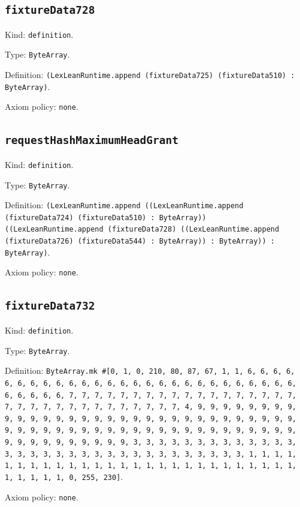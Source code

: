 \documentclass[11pt]{article}
\begin{document}
\subsection*{\texttt{fixtureData728}}
\noindent Kind: \texttt{definition}.\par
\noindent Type: \texttt{ByteArray}.\par
\noindent Definition: \texttt{(LexLeanRuntime.append (fixtureData725) (fixtureData510) : ByteArray)}.\par
\noindent Axiom policy: \texttt{none}.\par
\subsection*{\texttt{requestHashMaximumHeadGrant}}
\noindent Kind: \texttt{definition}.\par
\noindent Type: \texttt{ByteArray}.\par
\noindent Definition: \texttt{(LexLeanRuntime.append ((LexLeanRuntime.append (fixtureData724) (fixtureData510) : ByteArray)) ((LexLeanRuntime.append (fixtureData728) ((LexLeanRuntime.append (fixtureData726) (fixtureData544) : ByteArray)) : ByteArray)) : ByteArray)}.\par
\noindent Axiom policy: \texttt{none}.\par
\subsection*{\texttt{fixtureData732}}
\noindent Kind: \texttt{definition}.\par
\noindent Type: \texttt{ByteArray}.\par
\noindent Definition: \texttt{ByteArray.mk \#[0, 1, 0, 210, 80, 87, 67, 1, 1, 6, 6, 6, 6, 6, 6, 6, 6, 6, 6, 6, 6, 6, 6, 6, 6, 6, 6, 6, 6, 6, 6, 6, 6, 6, 6, 6, 6, 6, 6, 6, 6, 7, 7, 7, 7, 7, 7, 7, 7, 7, 7, 7, 7, 7, 7, 7, 7, 7, 7, 7, 7, 7, 7, 7, 7, 7, 7, 7, 7, 7, 7, 7, 7, 4, 9, 9, 9, 9, 9, 9, 9, 9, 9, 9, 9, 9, 9, 9, 9, 9, 9, 9, 9, 9, 9, 9, 9, 9, 9, 9, 9, 9, 9, 9, 9, 9, 9, 9, 9, 9, 9, 9, 9, 9, 9, 9, 9, 9, 9, 9, 9, 9, 9, 9, 9, 9, 9, 9, 9, 9, 9, 9, 9, 9, 9, 9, 9, 9, 3, 3, 3, 3, 3, 3, 3, 3, 3, 3, 3, 3, 3, 3, 3, 3, 3, 3, 3, 3, 3, 3, 3, 3, 3, 3, 3, 3, 3, 3, 3, 3, 1, 1, 1, 1, 1, 1, 1, 1, 1, 1, 1, 1, 1, 1, 1, 1, 1, 1, 1, 1, 1, 1, 1, 1, 1, 1, 1, 1, 1, 1, 1, 1, 0, 255, 230]}.\par
\noindent Axiom policy: \texttt{none}.\par
\end{document}
